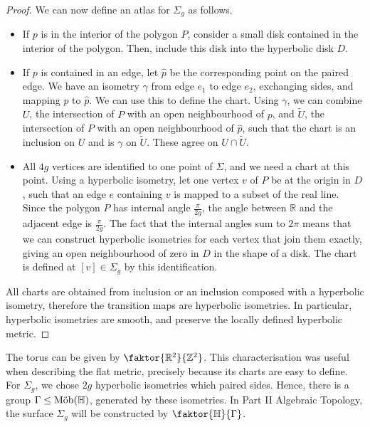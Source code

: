 \begin{proof}
	We can now define an atlas for \( \Sigma_g \) as follows.
	\begin{itemize}
		\item If \( p \) is in the interior of the polygon \( P \), consider a small disk contained in the interior of the polygon.
			Then, include this disk into the hyperbolic disk \( D \).
		\item If \( p \) is contained in an edge, let \( \hat p \) be the corresponding point on the paired edge.
			We have an isometry \( \gamma \) from edge \( e_1 \) to edge \( e_2 \), exchanging sides, and mapping \( p \) to \( \hat p \).
			We can use this to define the chart.
			Using \( \gamma \), we can combine \( U \), the intersection of \( P \) with an open neighbourhood of \( p \), and \( \widetilde U \), the intersection of \( P \) with an open neighbourhood of \( \hat p \), such that the chart is an inclusion on \( U \) and is \( \gamma \) on \( \widetilde U \).
			These agree on \( U \cap \widetilde U \).
		\item All \( 4g \) vertices are identified to one point of \( \Sigma \), and we need a chart at this point.
			Using a hyperbolic isometry, let one vertex \( v \) of \( P \) be at the origin in \( D \), such that an edge \( e \) containing \( v \) is mapped to a subset of the real line.
			Since the polygon \( P \) has internal angle \( \frac{\pi}{2g} \), the angle between \( \mathbb R \) and the adjacent edge is \( \frac{\pi}{2g} \).
			The fact that the internal angles sum to \( 2\pi \) means that we can construct hyperbolic isometries for each vertex that join them exactly, giving an open neighbourhood of zero in \( D \) in the shape of a disk.
			The chart is defined at \( [v] \in \Sigma_g \) by this identification.
	\end{itemize}
	All charts are obtained from inclusion or an inclusion composed with a hyperbolic isometry, therefore the transition maps are hyperbolic isometries.
	In particular, hyperbolic isometries are smooth, and preserve the locally defined hyperbolic metric.
\end{proof}
\begin{remark}
	The torus can be given by \( \faktor{\mathbb R^2}{\mathbb Z^2} \).
	This characterisation was useful when describing the flat metric, precisely because its charts are easy to define.
	For \( \Sigma_g \), we chose \( 2g \) hyperbolic isometries which paired sides.
	Hence, there is a group \( \Gamma \leq \text{M\"ob}(\mathbb H) \), generated by these isometries.
	In Part II Algebraic Topology, the surface \( \Sigma_g \) will be constructed by \( \faktor{\mathbb H}{\Gamma} \).
\end{remark}
